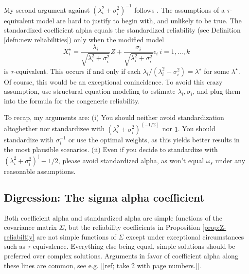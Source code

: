 \documentclass{article}
\theoremstyle{plain}
\theoremstyle{plain}
\theoremstyle{definition}
\theoremstyle{remark}
\theoremstyle{definition}
\theoremstyle{plain}
\theoremstyle{plain}
\theoremstyle{definition}
\begin{document}
My second argument against $(\lambda_{i}^{2}+\sigma_{i}^{2})^{-1}$
follows \citep{Falk2011-ae}. The assumptions of a $\tau$-equivalent model are hard
to justify to begin with, and unlikely to be true. The standardized
coefficient alpha equals the standardized reliability (see Definition \ref{defn:new reliabilities}) only when the modified model
\[
X_{i}^{\star}=\frac{\lambda_{i}}{\sqrt{\lambda_{i}^{2}+\sigma_{i}^{2}}}Z+\frac{\sigma_{i}}{\sqrt{\lambda_{i}^{2}+\sigma_{i}^{2}}}\epsilon_{i}\:i=1,\ldots,k
\]
is $\tau$-equivalent. This occurs if and only if each $\lambda_{i}/(\lambda_{i}^{2}+\sigma_{i}^{2})=\lambda^{\star}$
for some $\lambda^{\star}$. Of course, this would be an exceptional
conincidence. To avoid this crazy assumption, use structural equation
modeling to estimate $\lambda_{i},\sigma_{i}$, and plug them into
the formula for the congeneric reliability.

To recap, my arguments are: (i) You should neither avoid standardization altoghether nor standardizee with $(\lambda_{i}^{2}+\sigma_{i}^{2})^(-1/2)$ nor $1$. You should standardize with $\sigma_i^{-1}$ or use the optimal weights, as this yields better results in the most plausible scenarios. (ii) Even if you decide to standardize with $(\lambda_{i}^{2}+\sigma_{i}^{2})^(-1/2$, please avoid standardized alpha, as won't equal $\omega_s$ under any reasonable assumptions.


\subsection*{Digression: The sigma alpha coefficient}
Both coefficient alpha and standardized alpha are simple functions
of the covariance matrix $\Sigma$, but the reliability coefficients
in Proposition \ref{prop:Z-reliabiltiy} are not simple functions
of $\Sigma$ except under exceptional circumstances such as $\tau$-equivalence.
Everything else being equal, simple solutions should be preferred
over complex solutions. Arguments in favor of coefficient alpha along
these lines are common, see e.g. {[}{[}ref; take 2 with page numbers.{]}{]}.
\end{document}
